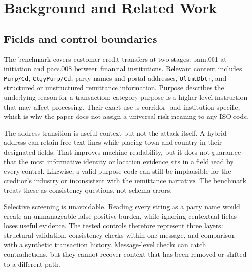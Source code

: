\documentclass[conference]{IEEEtran}
\begin{document}
\section{Background and Related Work}
\subsection{Fields and control boundaries}
The benchmark covers customer credit transfers at two stages: pain.001 at
initiation and pacs.008 between financial institutions. Relevant content
includes \texttt{Purp/Cd}, \texttt{CtgyPurp/Cd}, party names and postal
addresses, \texttt{UltmtDbtr}, and structured or unstructured remittance
information. Purpose describes the underlying reason for a transaction;
category purpose is a higher-level instruction that may affect processing.
Their exact use is corridor- and institution-specific, which is why the paper
does not assign a universal risk meaning to any ISO code.

The address transition is useful context but not the attack itself. A hybrid
address can retain free-text lines while placing town and country in their
designated fields. That improves machine readability, but it does not guarantee
that the most informative identity or location evidence sits in a field read
by every control. Likewise, a valid purpose code can still be implausible for
the creditor's industry or inconsistent with the remittance narrative. The
benchmark treats these as consistency questions, not schema errors.

Selective screening is unavoidable. Reading every string as a party name
would create an unmanageable false-positive burden, while ignoring contextual
fields loses useful evidence. The tested controls therefore represent three
layers: structural validation, consistency checks within one message, and
comparison with a synthetic transaction history. Message-level checks can
catch contradictions, but they cannot recover context that has been removed
or shifted to a different path.
\end{document}
